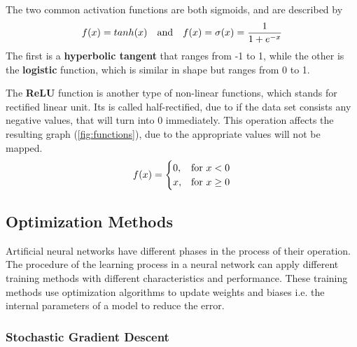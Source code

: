 The two common activation functions are both sigmoids, and are described by
$$ f(x)=tanh(x) ~~~ \hbox{and} ~~~ f(x)=\sigma (x)=\frac{1}{1+e^{-x}} $$
The first is a \textbf{hyperbolic tangent} that ranges from -1 to 1, while the other is the \textbf{logistic} function, which is similar in shape but ranges from 0 to 1. \smallskip

The \textbf{ReLU} function is another type of non-linear functions, which stands for rectified linear unit. Its is called half-rectified, due to if the data set consists any negative values, that will turn into 0 immediately. This operation affects the resulting graph (\autoref{fig:functions}), due to the appropriate values will not be mapped.
$$ f(x) = \begin{cases} 0, & \hbox{for}~ x < 0 \\ x, & \hbox{for}~ x \geq 0 \end{cases} $$



\subsection{Optimization Methods}

Artificial neural networks have different phases in the process of their operation. The procedure of the learning process in a neural network can apply different training methods with different characteristics and performance. These training methods use optimization algorithms to update weights and biases i.e. the internal parameters of a model to reduce the error. \cite{veerarajan2007numerical}\cite{pillo2013nonlinear}



\subsubsection{Stochastic Gradient Descent}

